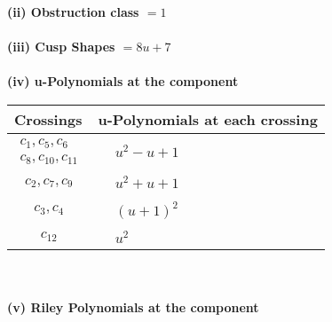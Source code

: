 \documentclass[1p]{elsarticle_modified}
\theoremstyle{definition}
\begin{document}
\flushleft \textbf{(ii) Obstruction class $= 1$}\\~\\
\flushleft \textbf{(iii) Cusp Shapes $= 8 u+7$}\\~\\
\newpage\renewcommand{\arraystretch}{1}
\flushleft \textbf{(iv) u-Polynomials at the component}\newline \\
\begin{tabular}{m{50pt}|m{274pt}}
Crossings & \hspace{64pt}u-Polynomials at each crossing \\
\hline $$\begin{aligned}c_{1},c_{5},c_{6}\\c_{8},c_{10},c_{11}\end{aligned}$$&$\begin{aligned}
&u^2- u+1
\end{aligned}$\\
\hline $$\begin{aligned}c_{2},c_{7},c_{9}\end{aligned}$$&$\begin{aligned}
&u^2+u+1
\end{aligned}$\\
\hline $$\begin{aligned}c_{3},c_{4}\end{aligned}$$&$\begin{aligned}
&(u+1)^2
\end{aligned}$\\
\hline $$\begin{aligned}c_{12}\end{aligned}$$&$\begin{aligned}
&u^2
\end{aligned}$\\
\hline
\end{tabular}\\~\\
\newpage\renewcommand{\arraystretch}{1}
\flushleft \textbf{(v) Riley Polynomials at the component}\newline \\
\end{document}

